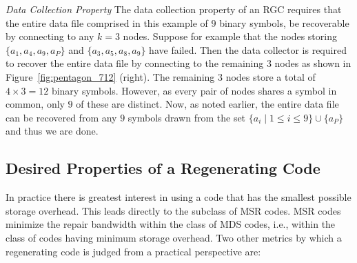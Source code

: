 \begin{multicols}{2}
{\em Data Collection Property} The data collection property of an RGC requires that the entire data file comprised in this example of $9$ binary symbols, be recoverable by connecting to any $k=3$ nodes.  Suppose for example that the nodes storing $\{a_1,a_4,a_9,a_P\}$ and $\{a_3,a_5,a_8,a_9\}$ have failed.  Then the data collector is required to recover the entire data file by connecting to the remaining $3$ nodes as
shown in Figure~\ref{fig:pentagon_712} (right).  The remaining $3$ nodes store a total of $4 \times 3=12$ binary symbols. However, as every pair of nodes shares a symbol in common, only $9$ of these are distinct.  Now, as noted earlier, the entire data file can be recovered from any $9$ symbols drawn from the set $\{a_i \mid 1 \leq i \leq 9\} \cup \{a_P\}$ and thus we are done. 

\subsection{Desired Properties of a Regenerating Code} 

In practice there is greatest interest in using a code that has the smallest possible storage overhead.  This leads directly to the subclass of MSR codes.  MSR codes minimize the repair bandwidth within the class of MDS codes, i.e., within the class of codes having minimum storage overhead.  Two other metrics by which a regenerating code is judged from a practical perspective are:
\end{multicols}

